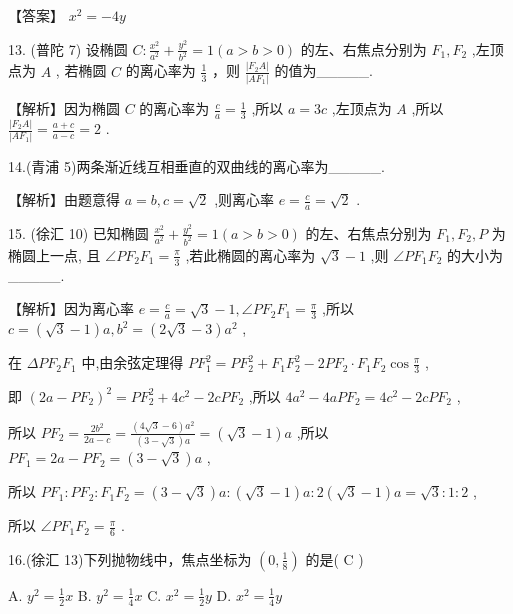 \documentclass[10pt]{article}
\begin{document}
【答案】 \({x}^{2} =  - {4y}\)

13. (普陀 7) 设椭圆 \(C : \frac{{x}^{2}}{{a}^{2}} + \frac{{y}^{2}}{{b}^{2}} = 1\left( {a > b > 0}\right)\) 的左、右焦点分别为 \({F}_{1},{F}_{2}\) ,左顶点为 \(A\) , 若椭圆 \(C\) 的离心率为 \(\frac{1}{3}\) ，则 \(\frac{\left| {F}_{2}A\right| }{\left| A{F}_{1}\right| }\) 的值为\_\_\_\_\_.

【解析】因为椭圆 \(C\) 的离心率为 \(\frac{c}{a} = \frac{1}{3}\) ,所以 \(a = {3c}\) ,左顶点为 \(A\) ,所以 \(\frac{\left| {F}_{2}A\right| }{\left| A{F}_{1}\right| } = \frac{a + c}{a - c} = 2\) .

14.(青浦 5)两条渐近线互相垂直的双曲线的离心率为\_\_\_\_\_.

【解析】由题意得 \(a = b,c = \sqrt{2}\) ,则离心率 \(e = \frac{c}{a} = \sqrt{2}\) .

15. (徐汇 10) 已知椭圆 \(\frac{{x}^{2}}{{a}^{2}} + \frac{{y}^{2}}{{b}^{2}} = 1\left( {a > b > 0}\right)\) 的左、右焦点分别为 \({F}_{1},{F}_{2},P\) 为椭圆上一点, 且 \(\angle P{F}_{2}{F}_{1} = \frac{\pi }{3}\) ,若此椭圆的离心率为 \(\sqrt{3} - 1\) ,则 \(\angle P{F}_{1}{F}_{2}\) 的大小为\_\_\_\_\_.

【解析】因为离心率 \(e = \frac{c}{a} = \sqrt{3} - 1,\angle P{F}_{2}{F}_{1} = \frac{\pi }{3}\) ,所以 \(c = \left( {\sqrt{3} - 1}\right) a,{b}^{2} = \left( {2\sqrt{3} - 3}\right) {a}^{2}\) ,

在 \({\Delta P}{F}_{2}{F}_{1}\) 中,由余弦定理得 \(P{F}_{1}^{2} = P{F}_{2}^{2} + {F}_{1}{F}_{2}^{2} - {2P}{F}_{2} \cdot  {F}_{1}{F}_{2}\cos \frac{\pi }{3}\) ,

即 \({\left( 2a - P{F}_{2}\right) }^{2} = P{F}_{2}^{2} + 4{c}^{2} - {2cP}{F}_{2}\) ,所以 \(4{a}^{2} - {4aP}{F}_{2} = 4{c}^{2} - {2cP}{F}_{2}\) ,

所以 \(P{F}_{2} = \frac{2{b}^{2}}{{2a} - c} = \frac{\left( {4\sqrt{3} - 6}\right) {a}^{2}}{\left( {3 - \sqrt{3}}\right) a} = \left( {\sqrt{3} - 1}\right) a\) ,所以 \(P{F}_{1} = {2a} - P{F}_{2} = \left( {3 - \sqrt{3}}\right) a\) ,

所以 \(P{F}_{1} : P{F}_{2} : {F}_{1}{F}_{2} = \left( {3 - \sqrt{3}}\right) a : \left( {\sqrt{3} - 1}\right) a : 2\left( {\sqrt{3} - 1}\right) a = \sqrt{3} : 1 : 2\) ,

所以 \(\angle P{F}_{1}{F}_{2} = \frac{\pi }{6}\) .

16.(徐汇 13)下列抛物线中，焦点坐标为 \(\left( {0,\frac{1}{8}}\right)\) 的是( C )

A. \({y}^{2} = \frac{1}{2}x\) B. \({y}^{2} = \frac{1}{4}x\) C. \({x}^{2} = \frac{1}{2}y\) D. \({x}^{2} = \frac{1}{4}y\)
\end{document}
